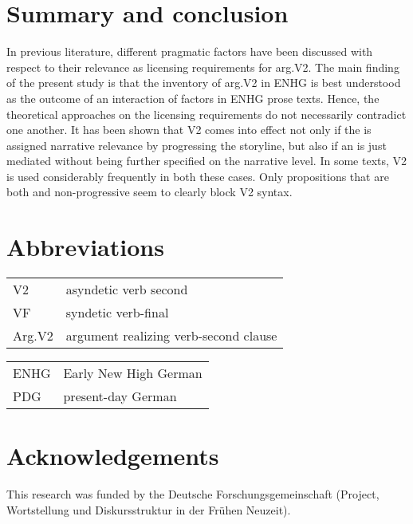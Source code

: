 \documentclass[output=paper,colorlinks,citecolor=brown]{langscibook}
\begin{document}
\section{Summary and conclusion} \label{sec:reetz:7}
In previous literature, different pragmatic factors have been discussed with respect to their relevance as licensing requirements for arg.V2. The main finding of the present study is that the inventory of arg.V2 in ENHG is best understood as the outcome of an interaction of factors in ENHG prose texts. Hence, the theoretical approaches on the licensing requirements do not necessarily contradict one another. It has been shown that V2 comes into effect not only if the  is assigned narrative relevance by progressing the storyline, but also if an  is just mediated without being further specified on the narrative level. In some texts, V2 is used considerably frequently in both these cases. Only propositions that are both  and non-progressive seem to clearly block V2 syntax.\\

\section{Abbreviations}
\begin{tabularx}{.5\textwidth}{lQ}
V2 & asyndetic verb second  \\
VF & syndetic verb-final  \\
Arg.V2 & argument realizing verb-second clause   \\
\end{tabularx}%
\begin{tabularx}{.5\textwidth}{lQ}
ENHG & Early New High German  \\
PDG & present-day German  \\
\end{tabularx}

\section*{Acknowledgements}
This research was funded by the Deutsche Forschungsgemeinschaft (Project, \glqq Wortstellung und Diskursstruktur in der Fr\"u{}hen Neuzeit\grqq).
\end{document}
